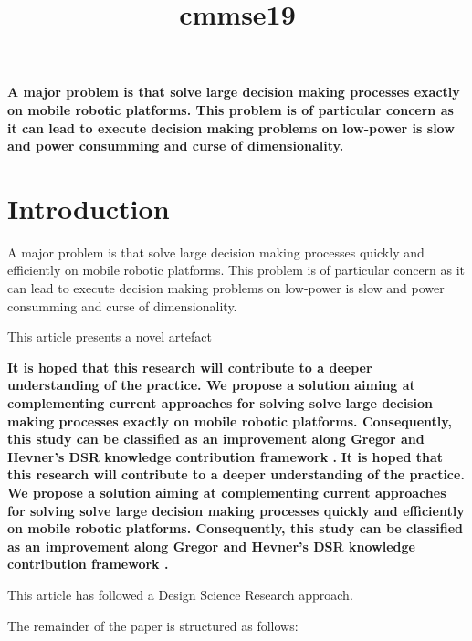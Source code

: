 \documentclass{article}
\title{cmmse19}
\author{}
\begin{document}
\maketitle
      

\textbf{
A major problem is that solve large decision making  processes exactly on mobile robotic platforms. This problem is of particular concern as it can lead to execute decision making problems on low-power is slow and power consumming and curse of dimensionality. 
}\section{Introduction}


    
A major problem is that solve large decision making  processes quickly and efficiently on mobile robotic platforms. This problem is of particular concern as it can lead to execute decision making problems on low-power is slow and power consumming and curse of dimensionality. 
    

    

    
This article presents a novel artefact
    

    
\textbf{
It is hoped that this research will contribute to a deeper understanding of the practice. We propose a solution aiming at complementing current approaches for solving solve large decision making  processes exactly on mobile robotic platforms. Consequently, this study can be classified as an improvement along Gregor and Hevner’s DSR knowledge contribution framework \cite{Gregor2013}.
}\textbf{
It is hoped that this research will contribute to a deeper understanding of the practice. We propose a solution aiming at complementing current approaches for solving solve large decision making  processes quickly and efficiently on mobile robotic platforms. Consequently, this study can be classified as an improvement along Gregor and Hevner’s DSR knowledge contribution framework \cite{Gregor2013}.
}
      
This article has followed a Design Science Research approach.

The remainder of the paper is structured as follows: 

    
      


\end{document}
